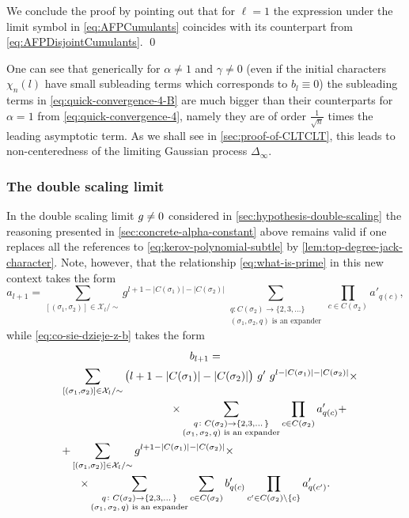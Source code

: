 \documentclass[12pt,usenames,dvipsnames,svgnames,table]{amsart}
\begin{document}
We conclude the proof by pointing out that for $\ell=1$ the expression under the limit symbol in \eqref{eq:AFPCumulants}
coincides with its counterpart from \eqref{eq:AFPDisjointCumulants}.
\qed

\begin{remark}
	One can see that generically for $\alpha\neq 1$ and $\gamma\neq 0$
	(even if the initial characters $\chi_n(l)$ have small subleading terms which corresponds to
	$b_l\equiv 0$) the subleading terms in
	\eqref{eq:quick-convergence-4-B}
	are much bigger than their counterparts for $\alpha=1$ from \eqref{eq:quick-convergence-4},
	namely they are of order $\frac{1}{\sqrt{n}}$ times the leading asymptotic term.
	As we shall see in \cref{sec:proof-of-CLTCLT}, 
	this leads to non-centeredness of the limiting Gaussian process $\Delta_\infty$. 
\end{remark}

\subsubsection{The double scaling limit}
\label{subsubsect:DoubleScaling}

In the double scaling limit $g\neq 0$ considered in \cref{sec:hypothesis-double-scaling}
the reasoning presented in \cref{sec:concrete-alpha-constant} above remains valid
if one replaces all the references to \eqref{eq:kerov-polynomial-subtle}
by \cref{lem:top-degree-jack-character}.
Note, however, that the relationship \eqref{eq:what-is-prime}
in this new context takes the form
\begin{equation*}
a_{l+1}= \sum_{[(\sigma_1,\sigma_2)]\in \mathcal{X}_l/\sim} g^{l+1-|C(\sigma_1)|-|C(\sigma_2)|} 
\sum_{\substack{q\colon C(\sigma_2)\to\{2,3,\dots\} \\
		\text{$(\sigma_1,\sigma_2,q)$ is an expander}}}
\prod_{c\in C(\sigma_2)} a'_{q(c)},
\end{equation*}
while \eqref{eq:co-sie-dzieje-z-b} takes the form
\begin{multline*} 
b_{l+1}=
\\
\shoveleft{\sum_{[(\sigma_1,\sigma_2)]\in \mathcal{X}_l/\sim} 
	\big({l+1-|C(\sigma_1)|-|C(\sigma_2)|}\big) 
	\ \sconstant' \ \sconstant^{l-|C(\sigma_1)|-|C(\sigma_2)|} \times} 
\\ 
\shoveright{\times
	\sum_{\substack{q\colon C(\sigma_2)\to\{2,3,\dots\} \\
			\text{$(\sigma_1,\sigma_2,q)$ is an expander}}}
	\prod_{c\in C(\sigma_2)} a'_{q(c)}+} \\
\shoveleft{
	+\sum_{[(\sigma_1,\sigma_2)]\in \mathcal{X}_l/\sim} \sconstant^{l+1-|C(\sigma_1)|-|C(\sigma_2)|} 
	\times 
} 
\\ 
\times
\sum_{\substack{q\colon C(\sigma_2)\to\{2,3,\dots\} \\
		\text{$(\sigma_1,\sigma_2,q)$ is an expander}}}
\sum_{c \in C(\sigma_2)} b'_{q(c)}\prod_{c'\in
	C(\sigma_2)\setminus\{c\}} a'_{q(c')}.
\end{multline*}
\end{document}
